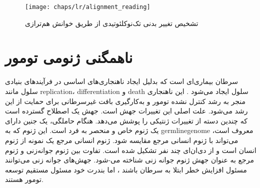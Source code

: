 \begin{figure}[!ht]
	\centerline{\texttt{[image: chaps/lr/alignment\_reading]}}
	\caption{تشخیص تغییر بدنی تک‌نوکلئوتیدی از طریق خوانش هم‌ترازی}
	\label{fig:ch_lr:alignment_reading}
\end{figure}



\section{ناهمگنی ژنومی تومور}

سرطان بیماری‌ای است که بدلیل ایجاد ناهنجاری‌های اساسی در فرآیند‌های بنیادی سلول مانند \gls{replication}، \gls{differentiation}  و \gls{death} سلول  ایجاد می‌شود \cite{hanahan2011hallmarks}. این ناهنجاری منجر به رشد کنترل نشده تومور و به‌کارگیری بافت غیرسرطانی برای حمایت از این رشد می‌شود. علت اصلی این تغییرات جهش است. جهش یک اصطلاح گسترده است که چندین دسته از تغییرات ژنتیکی را پوشش می‌دهد. هنگام حاملگی، یک جنین دارای یک ژنوم خاص و منحصر به فرد است. این ژنوم که به \gls{germlinegenome} معروف است، می‌تواند با ژنوم انسانی مرجع مقایسه شود. ژنوم انسانی مرجع یک نمونه از ژنوم انسان است و از دی‌ان‌ای چند نفر تشکیل شده است. تفاوت بین ژنوم جوانه‌زنی و ژنوم مرجع به عنوان جهش ژنوم جوانه زنی شناخته می-شود. جهش‌های جوانه زنی می‌توانند مسئول افزایش خطر ابتلا به سرطان باشند \cite{stewart2017world}، اما بندرت خود مسئول مستقیم توسعه تومور هستند. 




